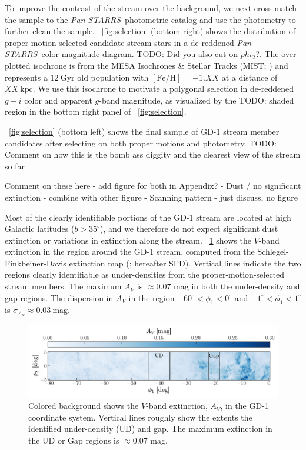 \documentclass[modern]{aastex62}
\newcommand{\pans}{\textsl{Pan-STARRS}}
\newcommand{\kpc}{\textrm{kpc}}
\newcommand{\feh}{\ensuremath{[\textrm{Fe} / \textrm{H}]}}
\newcommand{\todo}[1]{{\color{red} TODO: #1}}
\begin{document}
To improve the contrast of the stream over the background, we next cross-match
the sample to the \pans\ photometric catalog and use the photometry to further
clean the sample.
\figurename~\ref{fig:selection} (bottom right) shows the distribution of
proper-motion-selected candidate stream stars in a de-reddened \pans\
color-magnitude diagram.
\todo{Did you also cut on $phi_2$?}.
The over-plotted isochrone is from the MESA Isochrones \& Stellar Tracks (MIST;
\citealt{Dotter:2016, Choi:2016, Paxton:2011}) and represents a
$12~\textrm{Gyr}$ old population with $\feh = -1.XX$ at a distance of $XX~\kpc$.
We use this isochrone to motivate a polygonal selection in de-reddened $g-i$
color and apparent $g$-band magnitude, as visualized by the \todo{shaded} region
in the bottom right panel of \figurename~\ref{fig:selection}.

\figurename~\ref{fig:selection} (bottom left) shows the final sample of GD-1
stream member candidates after selecting on both proper motions and photometry.
\todo{Comment on how this is the bomb ass diggity and the clearest view of the
stream so far}


Comment on these here - add figure for both in Appendix?
- Dust / no significant extinction - combine with other figure
- Scanning pattern - just discuss, no figure

Most of the clearly identifiable portions of the GD-1 stream are located at high
Galactic latitudes ($b > 35^\circ$), and we therefore do not expect significant
dust extinction or variations in extinction along the stream.
\figurename~\ref{fig:sfd} shows the $V$-band extinction in the region around the
GD-1 stream, computed from the Schlegel-Finkbeiner-Davis extinction map
(\cite{Schlegel:1998}; hereafter SFD).
Vertical lines indicate the two regions clearly identifiable as under-densities
from the proper-motion-selected stream members.
The maximum $A_V$ is $\approx$0.07 mag in both the under-density and gap
regions.
The dispersion in $A_V$ in the region $-60^\circ < \phi_1 < 0^\circ$ and
$-1^\circ < \phi_1 < 1^\circ$ is $\sigma_{A_V} \approx 0.03~\textrm{mag}$.

\begin{figure}[h]
\begin{center}
\includegraphics[width=\textwidth]{sfd.pdf}
\end{center}
\caption{%
Colored background shows the $V$-band extinction, $A_V$, in the GD-1
coordinate system.
Vertical lines roughly show the extents the identified under-density (UD) and
gap.
The maximum extinction in the UD or Gap regions is $\approx$0.07 mag.
\label{fig:sfd}
}
\end{figure}
\end{document}
